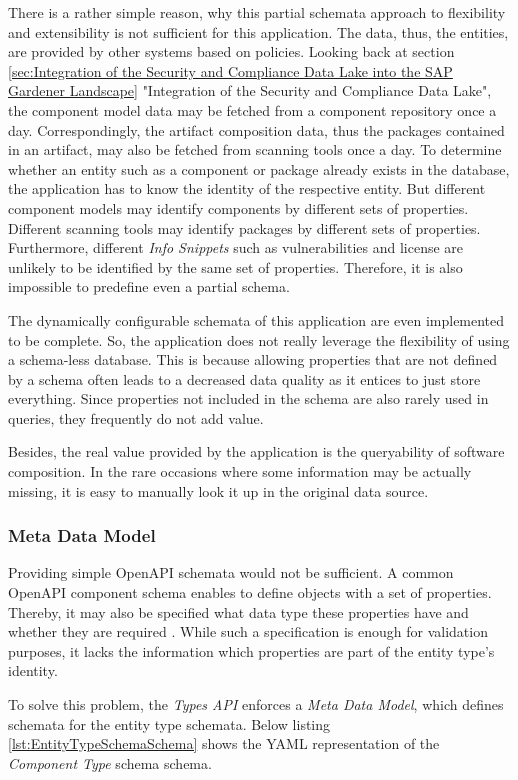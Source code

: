 There is a rather simple reason, why this partial schemata approach to flexibility and extensibility is not sufficient for this application. The data, thus, the entities, are provided by other systems based on policies. Looking back at section \ref{sec:Integration of the Security and Compliance Data Lake into the SAP Gardener Landscape} "Integration of the Security and Compliance Data Lake", the component model data may be fetched from a component repository once a day. Correspondingly, the artifact composition data, thus the packages contained in an artifact, may also be fetched from scanning tools once a day. To determine whether an entity such as a component or package already exists in the database, the application has to know the identity of the respective entity. But different component models may identify components by different sets of properties. Different scanning tools may identify packages by different sets of properties. Furthermore, different \emph{Info Snippets} such as vulnerabilities and license are unlikely to be identified by the same set of properties. Therefore, it is also impossible to predefine even a partial schema.\par 
The dynamically configurable schemata of this application are even implemented to be complete. So, the application does not really leverage the flexibility of using a schema-less database. This is because allowing properties that are not defined by a schema often leads to a decreased data quality as it entices to just store everything. Since properties not included in the schema are also rarely used in queries, they frequently do not add value.\par 
Besides, the real value provided by the application is the queryability of software composition. In the rare occasions where some information may be actually missing, it is easy to manually look it up in the original data source.  


\subsubsection{Meta Data Model} \label{sec:Meta Data Model}
Providing simple OpenAPI schemata would not be sufficient. A common OpenAPI component schema enables to define objects with a set of properties. Thereby, it may also be specified what data type these properties have and whether they are required \cite{OpenAPISpec}. While such a specification is enough for validation purposes, it lacks the information which properties are part of the entity type's identity.\par 
To solve this problem, the \emph{Types API} enforces a \emph{Meta Data Model}, which defines schemata for the entity type schemata. Below listing \ref{lst:EntityTypeSchemaSchema} shows the YAML representation of the \emph{Component Type} schema schema.

